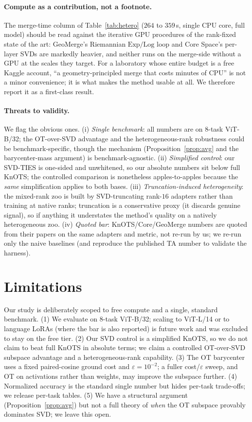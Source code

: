 \documentclass[11pt]{article}
\newcommand{\svdties}{\textsc{SVD-TIES}}
\begin{document}
\paragraph{Compute as a contribution, not a footnote.}
The merge-time column of Table~\ref{tab:hetero} ($264$ to $359$\,s, single CPU core, full model) should be
read against the iterative GPU procedures of the rank-fixed state of the art: GeoMerge's Riemannian
$\mathrm{Exp}/\mathrm{Log}$ loop and Core Space's per-layer SVDs are markedly heavier, and neither runs on
the merge-side without a GPU at the scales they target. For a laboratory whose entire budget is a free
Kaggle account, ``a geometry-principled merge that costs minutes of CPU'' is not a minor convenience; it
is what makes the method usable at all. We therefore report it as a first-class result.

\paragraph{Threats to validity.}
We flag the obvious ones. (i) \emph{Single benchmark}: all numbers are on $8$-task ViT-B/32; the
OT-over-SVD advantage and the heterogeneous-rank robustness could be benchmark-specific, though the
mechanism (Proposition~\ref{prop:avg} and the barycenter-mass argument) is benchmark-agnostic. (ii)
\emph{Simplified control}: our \svdties{} is one-sided and unwhitened, so our absolute numbers sit below
full KnOTS; the controlled comparison is nonetheless apples-to-apples because the \emph{same}
simplification applies to both bases. (iii) \emph{Truncation-induced heterogeneity}: the mixed-rank zoo is
built by SVD-truncating rank-$16$ adapters rather than training at native ranks; truncation is a
conservative proxy (it discards genuine signal), so if anything it understates the method's quality on a
natively heterogeneous zoo. (iv) \emph{Quoted bar}: KnOTS/Core/GeoMerge numbers are quoted from their
papers on the same adapters and metric, not re-run by us; we re-run only the naive baselines (and
reproduce the published TA number to validate the harness).

\section{Limitations}
\label{sec:limitations}
Our study is deliberately scoped to free compute and a single, standard benchmark. (1) We evaluate on
$8$-task ViT-B/32; scaling to ViT-L/14 or to language LoRAs (where the bar is also reported) is future
work and was excluded to stay on the free tier. (2) Our SVD control is a simplified KnOTS, so we do not
claim to beat full KnOTS in absolute terms; we claim a controlled OT-over-SVD subspace advantage and a
heterogeneous-rank capability. (3) The OT barycenter uses a fixed paired-cosine ground cost and
$\varepsilon=10^{-2}$; a fuller cost/$\varepsilon$ sweep, and OT on activations rather than weights, may
improve the subspace further. (4) Normalized accuracy is the standard single number but hides per-task
trade-offs; we release per-task tables. (5) We have a structural argument (Proposition~\ref{prop:avg})
but not a full theory of \emph{when} the OT subspace provably dominates SVD; we leave this open.
\end{document}

